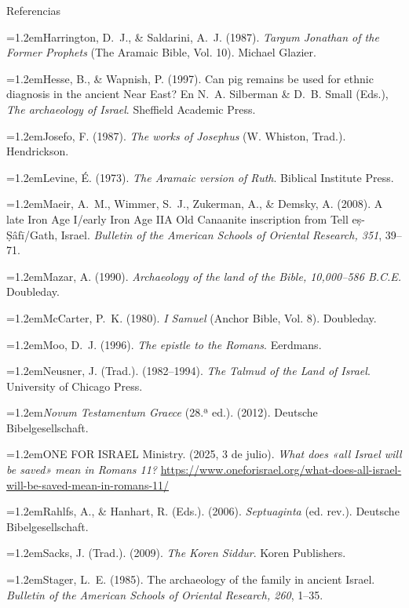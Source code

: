 \documentclass[hyperref={bookmarks=false},aspectratio=169]{beamer}
\newcommand{\refapa}[1]{\par\hangindent=1.2em\hangafter=1\noindent #1\par\vspace{3pt}}
\begin{document}
\begin{frame}[allowframebreaks]{Referencias}
\refapa{Harrington, D.~J., \& Saldarini, A.~J. (1987). \emph{Targum Jonathan of the Former Prophets} (The Aramaic Bible, Vol. 10). Michael Glazier.}
\refapa{Hesse, B., \& Wapnish, P. (1997). Can pig remains be used for ethnic diagnosis in the ancient Near East? En N.~A. Silberman \& D.~B. Small (Eds.), \emph{The archaeology of Israel}. Sheffield Academic Press.}
\refapa{Josefo, F. (1987). \emph{The works of Josephus} (W. Whiston, Trad.). Hendrickson.}
\refapa{Levine, É. (1973). \emph{The Aramaic version of Ruth}. Biblical Institute Press.}
\refapa{Maeir, A.~M., Wimmer, S.~J., Zukerman, A., \& Demsky, A. (2008). A late Iron Age I/early Iron Age IIA Old Canaanite inscription from Tell eṣ-Ṣâfī/Gath, Israel. \emph{Bulletin of the American Schools of Oriental Research, 351}, 39--71.}
\refapa{Mazar, A. (1990). \emph{Archaeology of the land of the Bible, 10,000--586 B.C.E.} Doubleday.}
\refapa{McCarter, P.~K. (1980). \emph{I Samuel} (Anchor Bible, Vol. 8). Doubleday.}
\refapa{Moo, D.~J. (1996). \emph{The epistle to the Romans}. Eerdmans.}
\refapa{Neusner, J. (Trad.). (1982--1994). \emph{The Talmud of the Land of Israel}. University of Chicago Press.}
\refapa{\emph{Novum Testamentum Graece} (28.ª ed.). (2012). Deutsche Bibelgesellschaft.}
\refapa{ONE FOR ISRAEL Ministry. (2025, 3 de julio). \emph{What does «all Israel will be saved» mean in Romans 11?} \url{https://www.oneforisrael.org/what-does-all-israel-will-be-saved-mean-in-romans-11/}}
\refapa{Rahlfs, A., \& Hanhart, R. (Eds.). (2006). \emph{Septuaginta} (ed. rev.). Deutsche Bibelgesellschaft.}
\refapa{Sacks, J. (Trad.). (2009). \emph{The Koren Siddur}. Koren Publishers.}
\refapa{Stager, L.~E. (1985). The archaeology of the family in ancient Israel. \emph{Bulletin of the American Schools of Oriental Research, 260}, 1--35.}
\end{frame}
\end{document}
